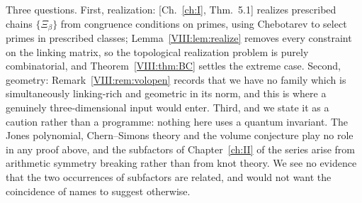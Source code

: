 Three questions. First, realization: [Ch.~\ref{ch:I}, Thm.~5.1] realizes prescribed chains
$\{\Xi_\beta\}$ from congruence conditions on primes, using Chebotarev to select primes in
prescribed classes; Lemma~\ref{VIII:lem:realize} removes every constraint on the linking matrix,
so the topological realization problem is purely combinatorial, and Theorem~\ref{VIII:thm:BC}
settles the extreme case. Second, geometry: Remark~\ref{VIII:rem:volopen} records that we have no
family which is simultaneously linking-rich and geometric in its norm, and this is where a
genuinely three-dimensional input would enter. Third, and we state it as a caution rather than a
programme: nothing here uses a quantum invariant. The Jones polynomial, Chern--Simons theory
and the volume conjecture play no role in any proof above, and the subfactors of Chapter~\ref{ch:II}
of the series arise from arithmetic symmetry breaking rather than from knot theory. We
see no evidence that the two occurrences of subfactors are related, and would not want the
coincidence of names to suggest otherwise.

